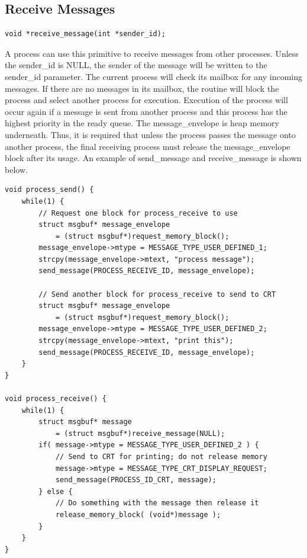 \documentclass[12pt]{report}
\begin{document}
\subsection{Receive Messages}
\label{sec:receive_message}

\begin{lstlisting}
void *receive_message(int *sender_id);
\end{lstlisting}
\par A process can use this primitive to receive messages from other processes. Unless the sender\_id is NULL, the sender of the message will be written to the sender\_id parameter. The current process will check its mailbox for any incoming messages. If there are no messages in its mailbox, the routine will block the process and select another process for execution. Execution of the process will occur again if a message is sent from another process and this process has the highest priority in the ready queue. The message\_envelope is heap memory underneath. Thus, it is required that unless the process passes the message onto another process, the final receiving process must release the message\_envelope block after its usage. An example of send\_message and receive\_message is shown below.

\begin{lstlisting}
void process_send() {
    while(1) {
        // Request one block for process_receive to use
        struct msgbuf* message_envelope
            = (struct msgbuf*)request_memory_block();
        message_envelope->mtype = MESSAGE_TYPE_USER_DEFINED_1;
        strcpy(message_envelope->mtext, "process message");
        send_message(PROCESS_RECEIVE_ID, message_envelope);

        // Send another block for process_receive to send to CRT
        struct msgbuf* message_envelope
            = (struct msgbuf*)request_memory_block();
        message_envelope->mtype = MESSAGE_TYPE_USER_DEFINED_2;
        strcpy(message_envelope->mtext, "print this");
        send_message(PROCESS_RECEIVE_ID, message_envelope);
    }
}

void process_receive() {
    while(1) {
        struct msgbuf* message
            = (struct msgbuf*)receive_message(NULL);
        if( message->mtype = MESSAGE_TYPE_USER_DEFINED_2 ) {
            // Send to CRT for printing; do not release memory
            message->mtype = MESSAGE_TYPE_CRT_DISPLAY_REQUEST;
            send_message(PROCESS_ID_CRT, message);
        } else {
            // Do something with the message then release it
            release_memory_block( (void*)message );
        }
    }
}
\end{lstlisting}
\end{document}
